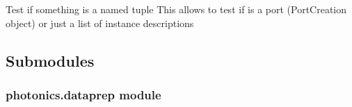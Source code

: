 \documentclass[a4paper,10pt,english]{sphinxmanual}
\begin{document}

\begin{fulllineitems}
\label{\detokenize{photonics/photonics:kppc.photonics.is_named_tuple_instance}}
Test if something is a named tuple
This allows to test if  is a port (PortCreation object) or just a list of instance descriptions

\end{fulllineitems}



\subsection{Submodules}
\label{\detokenize{photonics/photonics:submodules}}

\subsubsection{photonics.dataprep module}
\label{\detokenize{photonics/photonics:module-kppc.photonics.dataprep}}\label{\detokenize{photonics/photonics:photonics-dataprep-module}}
\end{document}
